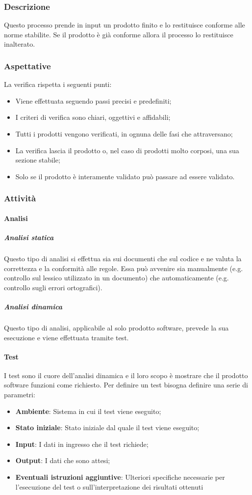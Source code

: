 \subsubsection{Descrizione}
Questo processo prende in input un prodotto finito e lo restituisce conforme alle norme stabilite. Se il prodotto è già 
conforme allora il processo lo restituisce inalterato.

\subsubsection{Aspettative}
La verifica rispetta i seguenti punti:
\begin{itemize}
    \item Viene effettuata seguendo passi precisi e predefiniti;
    \item I criteri di verifica sono chiari, oggettivi e affidabili;
    \item Tutti i prodotti vengono verificati, in ognuna delle fasi che attraversano;
    \item La verifica lascia il prodotto o, nel caso di prodotti molto corposi, una sua sezione stabile;
    \item Solo se il prodotto è interamente validato può passare ad essere validato.
\end{itemize}

\subsubsection{Attività}
\paragraph{Analisi}
\subparagraph{Analisi statica}
Questo tipo di analisi si effettua sia sui documenti che sul codice e ne valuta la correttezza e la conformità alle 
regole. Essa può avvenire sia manualmente (e.g. controllo sul lessico utilizzato in un documento) che automaticamente 
(e.g. controllo sugli errori ortografici).
\subparagraph{Analisi dinamica}
Questo tipo di analisi, applicabile al solo prodotto software, prevede la sua esecuzione e viene effettuata tramite test.

\paragraph{Test}
I test sono il cuore dell'analisi dinamica e il loro scopo è mostrare che il prodotto software funzioni come richiesto. 
Per definire un test bisogna definire una serie di parametri:
\begin{itemize}
    \item \textbf{Ambiente}: Sistema in cui il test viene eseguito;
    \item \textbf{Stato iniziale}: Stato iniziale dal quale il test viene eseguito;
    \item \textbf{Input}: I dati in ingresso che il test richiede;
    \item \textbf{Output}: I dati che sono attesi;
    \item \textbf{Eventuali istruzioni aggiuntive}: Ulteriori specifiche necessarie per l'esecuzione del test o sull'interpretazione dei risultati ottenuti
\end{itemize}

